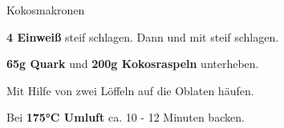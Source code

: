 \begin{recipe}[]{Kokosmakronen} %

\step
\textbf{4 Einweiß} steif schlagen. Dann  und  mit steif schlagen.

\step
\textbf{65g Quark} und \textbf{200g Kokosraspeln} unterheben.

\step
Mit Hilfe von zwei Löffeln auf die Oblaten häufen.

\step
Bei \textbf{175°C Umluft} ca. 10 - 12 Minuten backen.

\end{recipe}